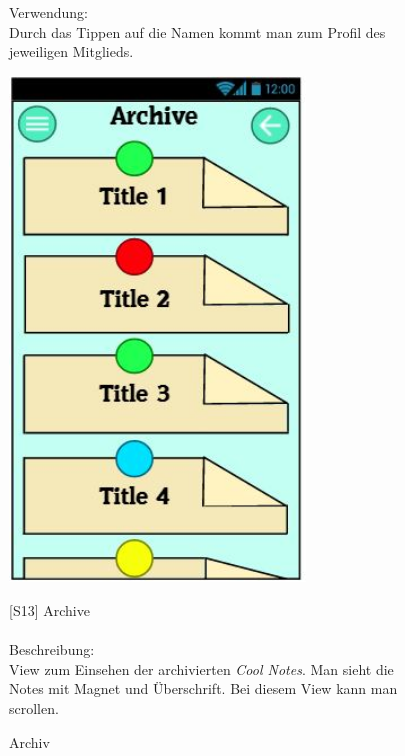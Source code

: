 \documentclass[a4paper]{scrreprt}
\begin{document}
\begin{figure}[h!]
\begin{minipage}[t]{0.65\linewidth}
\begin{itemize}
    			\end{itemize}
    			
    			\hfill 
    			
    			Verwendung:\\
    			Durch das Tippen auf die Namen kommt man 
    			zum Profil des jeweiligen Mitglieds.
    			   			
    			
    		\end{minipage}
    	\end{figure}
    	\clearpage
    	
    	\begin{figure}[h]
    		\begin{minipage}[b]{0.37\linewidth}
    			\flushright
    			\centering
    			\includegraphics[width=0.7\textwidth]{fridget_archive.JPG}
    			\caption{Archiv}
    			\label{fig:figure1}
    			\vspace{22mm}
    		\end{minipage}
    		\hspace{0.5cm}
    		\begin{minipage}[b]{0.6\linewidth}
    			\flushleft
    			{[}S13{]} Archive \\
    			\hfill
    			\\Beschreibung: \\
    			View zum Einsehen der archivierten \textit{Cool Notes}.
    			Man sieht die Notes mit Magnet und Überschrift.
    			Bei diesem View kann man scrollen.\\
    			

\end{minipage}
\end{figure}
\end{document}
